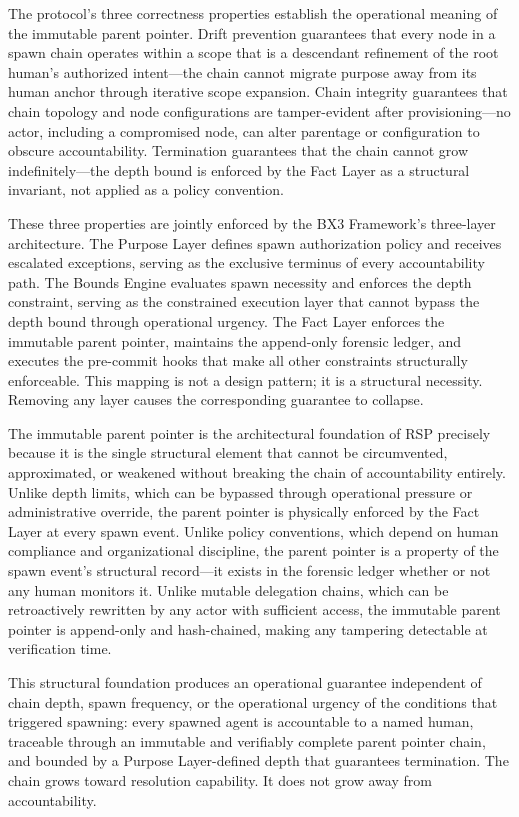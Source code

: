 The protocol's three correctness properties establish the operational meaning of the immutable parent pointer. Drift prevention guarantees that every node in a spawn chain operates within a scope that is a descendant refinement of the root human's authorized intent---the chain cannot migrate purpose away from its human anchor through iterative scope expansion. Chain integrity guarantees that chain topology and node configurations are tamper-evident after provisioning---no actor, including a compromised node, can alter parentage or configuration to obscure accountability. Termination guarantees that the chain cannot grow indefinitely---the depth bound is enforced by the Fact Layer as a structural invariant, not applied as a policy convention.

These three properties are jointly enforced by the BX3 Framework's three-layer architecture. The Purpose Layer defines spawn authorization policy and receives escalated exceptions, serving as the exclusive terminus of every accountability path. The Bounds Engine evaluates spawn necessity and enforces the depth constraint, serving as the constrained execution layer that cannot bypass the depth bound through operational urgency. The Fact Layer enforces the immutable parent pointer, maintains the append-only forensic ledger, and executes the pre-commit hooks that make all other constraints structurally enforceable. This mapping is not a design pattern; it is a structural necessity. Removing any layer causes the corresponding guarantee to collapse.

The immutable parent pointer is the architectural foundation of RSP precisely because it is the single structural element that cannot be circumvented, approximated, or weakened without breaking the chain of accountability entirely. Unlike depth limits, which can be bypassed through operational pressure or administrative override, the parent pointer is physically enforced by the Fact Layer at every spawn event. Unlike policy conventions, which depend on human compliance and organizational discipline, the parent pointer is a property of the spawn event's structural record---it exists in the forensic ledger whether or not any human monitors it. Unlike mutable delegation chains, which can be retroactively rewritten by any actor with sufficient access, the immutable parent pointer is append-only and hash-chained, making any tampering detectable at verification time.

This structural foundation produces an operational guarantee independent of chain depth, spawn frequency, or the operational urgency of the conditions that triggered spawning: every spawned agent is accountable to a named human, traceable through an immutable and verifiably complete parent pointer chain, and bounded by a Purpose Layer-defined depth that guarantees termination. The chain grows toward resolution capability. It does not grow away from accountability.

